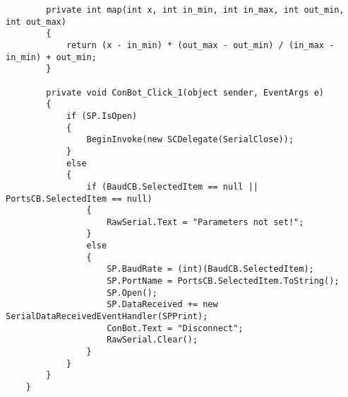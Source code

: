 \begin{lstlisting}
        private int map(int x, int in_min, int in_max, int out_min, int out_max)
        {
            return (x - in_min) * (out_max - out_min) / (in_max - in_min) + out_min;
        }

        private void ConBot_Click_1(object sender, EventArgs e)
        {
            if (SP.IsOpen)
            {
                BeginInvoke(new SCDelegate(SerialClose));
            }
            else
            {
                if (BaudCB.SelectedItem == null || PortsCB.SelectedItem == null)
                {
                    RawSerial.Text = "Parameters not set!";
                }
                else
                {
                    SP.BaudRate = (int)(BaudCB.SelectedItem);
                    SP.PortName = PortsCB.SelectedItem.ToString();
                    SP.Open();
                    SP.DataReceived += new SerialDataReceivedEventHandler(SPPrint);
                    ConBot.Text = "Disconnect";
                    RawSerial.Clear();
                }
            }
        }
    }
\end{lstlisting}